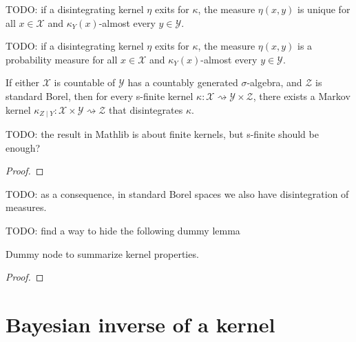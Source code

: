 TODO: if a disintegrating kernel $\eta$ exits for $\kappa$, the measure $\eta(x,y)$ is unique for all $x \in \mathcal X$ and $\kappa_{Y}(x)$-almost every $y \in \mathcal Y$.

TODO: if a disintegrating kernel $\eta$ exits for $\kappa$, the measure $\eta(x,y)$ is a probability measure for all $x \in \mathcal X$ and $\kappa_{Y}(x)$-almost every $y \in \mathcal Y$.

\begin{theorem}
  \label{thm:disintegration}
  \mathlibok
  If either $\mathcal X$ is countable of $\mathcal Y$ has a countably generated $\sigma$-algebra, and $\mathcal Z$ is standard Borel, then for every s-finite kernel $\kappa : \mathcal X \rightsquigarrow \mathcal Y \times \mathcal Z$, there exists a Markov kernel $\kappa_{Z \mid Y} : \mathcal X \times \mathcal Y \rightsquigarrow \mathcal Z$ that disintegrates $\kappa$.
\end{theorem}

TODO: the result in Mathlib is about finite kernels, but s-finite should be enough?

\begin{proof}\mathlibok
\uses{}
\end{proof}

TODO: as a consequence, in standard Borel spaces we also have disintegration of measures.



TODO: find a way to hide the following dummy lemma
\begin{lemma}
  \label{lem:kernel_properties}
  \leanok
  Dummy node to summarize kernel properties.
\end{lemma}

\begin{proof}\leanok
{}
\end{proof}




\section{Bayesian inverse of a kernel}

